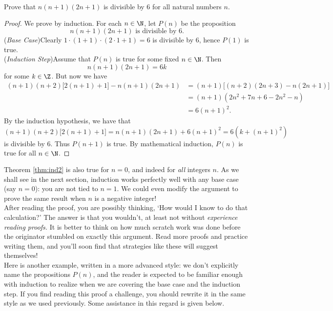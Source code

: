 \begin{thm}\label{thm:ind2}
Prove that $n(n+1)(2n+1)$ is divisible by 6 for all natural numbers $n$.
\end{thm}

\begin{proof}
We prove by induction. For each $n\in\N$, let $P(n)$ be the proposition
\[\text{$n(n+1)(2n+1)$ is divisible by 6.}\]
(\emph{Base Case})\quad Clearly $1\cdot (1+1)\cdot (2\cdot 1+1)=6$ is divisible by 6, hence $P(1)$ is true.\\[5pt]
(\emph{Induction Step})\quad Assume that $P(n)$ is true for some fixed $n\in\N$. Then
\[n(n+1)(2n+1)=6k\]
for some $k\in\Z$. But now we have
\begin{align*}
(n+1)(n+2)\bigl[2(n+1)+1\bigr]-n(n+1)(2n+1)&=(n+1)\bigl[(n+2)(2n+3)-n(2n+1)\bigr]\\
&=(n+1)(2n^2+7n+6-2n^2-n)\\
&=6(n+1)^2.
\end{align*}
By the induction hypothesis, we have that
\[(n+1)(n+2)\bigl[2(n+1)+1\bigr]=n(n+1)(2n+1)+6(n+1)^2=6(k+(n+1)^2)\]
is divisible by 6. Thus $P(n+1)$ is true. By mathematical induction, $P(n)$ is true for all $n\in\N$.
\end{proof}

\noindent Theorem \ref{thm:ind2} is also true for $n=0$, and indeed for \emph{all} integers $n$. As we shall see in the next section, induction works perfectly well with any base case (say $n=0$): you are not tied to $n=1$. We could even modify the argument to prove the same result when $n$ is a negative integer!\\

\noindent After reading the proof, you are possibly thinking, `How would I know to do that calculation?' The answer is that you wouldn't, at least not without \emph{experience reading proofs.} It is better to think on how much scratch work was done before the originator stumbled on exactly this argument. Read more proofs and practice writing them, and you'll soon find that strategies like these will suggest themselves!\\

Here is another example, written in a more advanced style: we don't explicitly name the propositions $P(n)$, and the reader is expected to be familiar enough with induction to realize when we are covering the base case and the induction step. If you find reading this proof a challenge, you should rewrite it in the same style as we used previously. Some assistance in this regard is given below.

